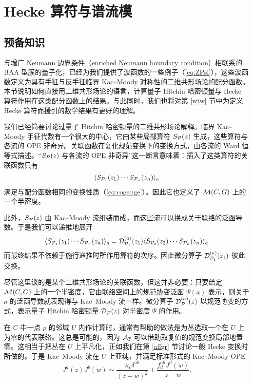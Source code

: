 
\section{Hecke 算符与谱流模}\label{sec:chiral}

\subsection{预备知识}

与增广 Neumann 边界条件（enriched Neumann boundary condition）相联系的 BAA 型膜的量子化，已经为我们提供了波函数的一些例子（\ref{eq:ZPsi}），这些波函数定义为具有手征与反手征临界 Kac--Moody 对称性的二维共形场论的配分函数。本节说明如何直接用二维共形场论的语言，计算量子 Hitchin 哈密顿量与 Hecke 算符作用在这类配分函数上的结果。与此同时，我们也将对第 \ref{wtw} 节中为定义 Hecke 算符而援引的数学结果有更好的理解。

我们已经简要讨论过量子 Hitchin 哈密顿量的二维共形场论解释。临界 Kac--Moody 手征代数有一个很大的中心，它由某些局部算符 $S_{\cal P}(z)$ 生成，这些算符与各流的 OPE 非奇异。关联函数在复化规范变换下的变换方式，由各流的 Ward 恒等式描述。“$S_{\cal P}(z)$ 与各流的 OPE 非奇异”这一断言意味着：插入了这类算符的关联函数只有
\begin{equation}
\langle S_{{\cal P}_1}(z_1) \cdots S_{{\cal P}_n}(z_n) \rangle_a
\end{equation}
满足与配分函数相同的变换性质（\ref{eq:cogauge}）。因此它也定义了 $\M(C,G)$ 上的一个半密度。

此外，$S_{\cal P}(z)$ 由 Kac--Moody 流组装而成，而这些流可以换成关于联络的泛函导数。于是我们可以递推地展开
\begin{equation}
\langle S_{{\cal P}_1}(z_1) \cdots S_{{\cal P}_n}(z_n) \rangle_a = {\cal D}^{(a)}_{\P_1}(z_1 )\langle S_{{\cal P}_2}(z_2) \cdots S_{{\cal P}_n}(z_n) \rangle_a
\end{equation}
而最终结果不依赖于施行递推时所作用算符的次序。因此微分算子 ${\cal D}^{(a)}_{\P_1}(z_1 )$ 彼此交换。

尽管这里谈的是某个二维共形场论的关联函数，但这并非必要：只要给定 $\M(C,G)$ 上的一个半密度，它由联络空间上的规范协变泛函 $\Psi(a)$ 表示，则关于 $a$ 的泛函导数就表现得与 Kac--Moody 流一样。微分算子 ${\cal D}^{(a)}_{\P}(z)$ 以规范协变的方式，表示量子 Hitchin 哈密顿量 ${\cal D}_{\P}(z)$ 对半密度 $\Psi$ 的作用。

在 $C$ 中一点 $p$ 的邻域 $U$ 内作计算时，通常有帮助的做法是为丛选取一个在 $U$ 上为零的代表联络。这总是可能的，因为 $\cA_{\bar z}$ 可以借助取复值的规范变换局部地置零。这相当于把丛在 $U$ 上平凡化，正如我们在第 \ref{affgr} 节讨论一般 Hecke 变换时所做的。于是 Kac--Moody 流在 $U$ 上亚纯，并满足标准形式的 Kac--Moody OPE
\begin{equation}
J^a(z) J^b(w) \sim \frac{\kappa_c \delta^{ab}}{(z-w)^2} + \frac{f^{ab}_d J^d(w)}{z-w}.
\end{equation}

